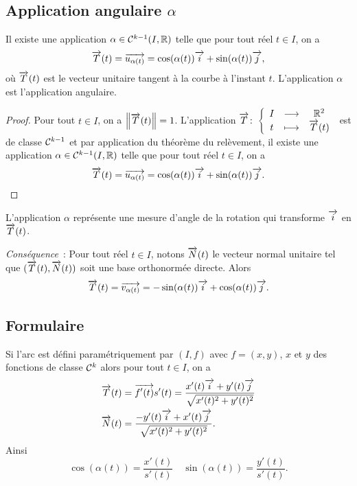 \subsection{Application angulaire \(\alpha\)}

\begin{prop}
  Il existe une application \(\alpha \in \mathcal{C}^{k-1}(I, \mathbb{R})\) telle que pour 
  tout réel \(t \in I\), on a
  \begin{equation}
    \overrightarrow{T}(t) = \overrightarrow{u_{\alpha(t)}} = \cos(\alpha(t)) \overrightarrow{i} + \sin(\alpha(t)) 
    \overrightarrow{j},
  \end{equation}
  où \(\overrightarrow{T}(t)\) est le vecteur unitaire tangent à la courbe à l'instant 
  \(t\). L'application \(\alpha\) est l'application angulaire.
\end{prop}
\begin{proof}
  Pour tout \(t \in I\), on a \(\left\lVert\overrightarrow{T}(t)\right\rVert=1\). L'application 
  \(\overrightarrow{T}\colon \left\{\begin{array}{ccc} I & \longrightarrow &\mathbb{R}^2\\ t & \longmapsto & \overrightarrow{T}(t) \end{array} \right.\) est de classe 
  \(\mathcal{C}^{k-1}\) et par application du théorème du relèvement, il existe une 
  application \(\alpha \in \mathcal{C}^{k-1}(I, \mathbb{R})\) telle que pour tout réel \(t 
  \in I\), on a
  \begin{equation}
    \overrightarrow{T}(t) = \overrightarrow{u_{\alpha(t)}} = \cos(\alpha(t)) \overrightarrow{i} + \sin(\alpha(t)) 
    \overrightarrow{j}.
  \end{equation}
\end{proof}

L'application \(\alpha\) représente une mesure d'angle de la rotation qui 
transforme \(\overrightarrow{i}\) en \(\overrightarrow{T}(t)\).

\emph{Conséquence}~: Pour tout réel \(t \in I\), notons \(\overrightarrow{N}(t)\) le 
vecteur normal unitaire tel que \((\overrightarrow{T}(t), \overrightarrow{N}(t))\) soit une base 
orthonormée directe. Alors \begin{equation}
  \overrightarrow{T}(t) = \overrightarrow{v_{\alpha(t)}} = -\sin(\alpha(t)) \overrightarrow{i} + \cos(\alpha(t)) 
  \overrightarrow{j}.
\end{equation}

\subsection{Formulaire}

Si l'arc est défini paramétriquement par \((I,f)\) avec \(f=(x,y)\), \(x\) et 
\(y\) des fonctions de classe \(\mathcal{C}^{k}\) alors pour tout \(t \in I\), on a
\begin{align}
  \overrightarrow{T}(t) &= \overrightarrow{f'(t)}{s'(t)} = 
  \frac{x'(t)\overrightarrow{i}+y'(t)\overrightarrow{j}}{\sqrt{x'(t)^2+y'(t)^2}} \\
  \overrightarrow{N}(t) &= \frac{-y'(t)\overrightarrow{i}+x'(t)\overrightarrow{j}}{\sqrt{x'(t)^2+y'(t)^2}}.
\end{align}
Ainsi
\begin{equation}
  \cos(\alpha(t)) = \frac{x'(t)}{s'(t)} \quad \sin(\alpha(t)) = 
  \frac{y'(t)}{s'(t)}.
\end{equation}

